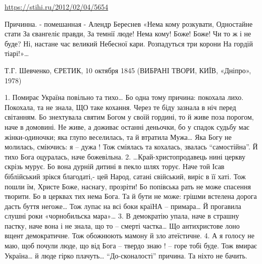  
 
 
 
 

\url{https://stihi.ru/2012/02/04/5654}

Причинна. - помешанная -
Алендр Береснев
                «Нема кому розкувати,
                Одностайне стати
                За євангеліє правди,
                За темнії люде!
                Нема кому! Боже! Боже!
                Чи то ж і не буде?
                Ні, настане час великий
                Небесної кари.
                Розпадуться три корони
                На гордій тіарі!»…

                Т.Г. Шевченко, ЄРЕТИК, 10 октября 1845 (ВИБРАНІ ТВОРИ, КИЇВ, «Дніпро», 1978)

   1.
Помирає Україна
повільно та тихо…
Бо одна тому причина:
покохала лихо.
               Покохала, та не знала,
               ЩО таке кохання.
               Через те біду зазнала
               в ніч перед світанням.
Бо знехтувала святим Богом
у своїй гордині,
то й живе поза порогом,
наче в домовині.
              Не живе, а доживає
              останні деньочки,
              бо у спадок судьбу має
              жінки-одиночки;
яка глупо веселилась,
та й втратила Мужа…
Яка Богу не молилась,
сміючись:   я – дужа !
              Тож сміялась та кохалась,
               звалась “самостійна”.
               Й тихо Бога оцуралась,
               наче божевільна.
   2.
…Край-христопродавець нині
церкву скрізь мурує.
Бо вона дурній дитині
в пекло шлях торує.
               Наче той Ісав біблійський
               зрікся благодаті,-
               цей Народ, сатані свійський,
               виріс в її хаті.
Тож пошли їм, Христе Боже,
наснагу, прозріти!
Бо попівська рать не може
спасення творити.
               Бо в церквах тих нема Бога.
               Та й бути не може:
               грішми встелена дорога
               дасть буття негоже…
Тож лупає на всі боки
країНА – примара…
Й прогавила слушні роки
«чорнобильска мара»…
   3.
В демократію упала,
наче в страшну пастку,
наче вона і не знала,
що то – смерті частка…
              Що антихристове лоно
              вщент демократичне.
              Тож обожнюють мамону
              й зло атеїстичне.
   4.
А я голосу не маю,
щоб почули люде,
що від Бога – твердо знаю ! –
горе тобі буде.
              Тож вмирає Україна…
              й люде гірко плачуть…
              “До-сконалості” причина.
              Та ніхто не бачить.

